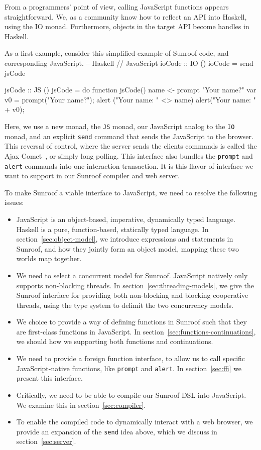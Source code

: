 \documentclass{llncs}
\newcommand{\Src}[1]{{\tt{#1}}}
\newenvironment{Code}{\verbatim}{\endverbatim}
\begin{document}
From a programmers' point of view, calling JavaScript functions
appears straightforward. We, as a community know how to reflect an
API into Haskell, using the IO monad. Furthermore, objects in
the target API become handles in Haskell. 

As a first example, consider this simplified example of Sunroof code, and corresponding JavaScript.
\noindent
\begin{Code}
-- Haskell                          // JavaScript
ioCode :: IO ()
ioCode = send jsCode

jsCode :: JS ()
jsCode = do                        function jsCode() {
   name <- prompt "Your name?"       var v0 = prompt("Your name?"); 
   alert ("Your name: " <> name)     alert("Your name: " + v0); 
                                   }
\end{Code}%

Here, we use a new monad, the \Src{JS} monad, our JavaScript
analog to the \Src{IO} monad,
and an explicit \Src{send} command that sends the JavaScript to the browser.
This reversal of control, where the
server sends the clients commands is called the Ajax Comet~\cite{..},
or simply long polling.
This interface also bundles the \Src{prompt} and \Src{alert} commands
into one interaction transaction.
It is this flavor of interface we want to support in our Sunroof compiler
and web server.  

To make Sunroof a viable interface to JavaScript, we need to
resolve the following issues:
\begin{itemize}
\item JavaScript is an object-based, imperative, dynamically typed language.
Haskell is a pure, function-based, statically typed language.
In section~\ref{sec:object-model}, we introduce expressions and statements
in Sunroof, and how they jointly form an object model,
mapping these two worlds map together.
%
\item We need to select a concurrent model for Sunroof.
JavaScript natively only supports non-blocking threads.
In section~\ref{sec:threading-models}, we give the
Sunroof interface for providing both non-blocking and blocking cooperative threads,
using the type system to delimit the two concurrency models.
%
\item We choice to provide a way of defining functions
in Sunroof such that they are first-class functions
in JavaScript. In section~\ref{sec:functions-continuations},
we should how we supporting both functions and continuations.
%
\item We need to provide a foreign function interface,
to allow us to call specific JavaScript-native functions,
like \Src{prompt} and \Src{alert}.
In section~\ref{sec:ffi} we present this interface.
%
\item Critically, we need to be able to compile our Sunroof DSL
into JavaScript. We examine this in section~\ref{sec:compiler}.
\item To enable the compiled code to dynamically interact with
a web browser, we provide an expansion of the \Src{send} idea above,
which we discuss in section~\ref{sec:server}.
\end{itemize}
\end{document}
